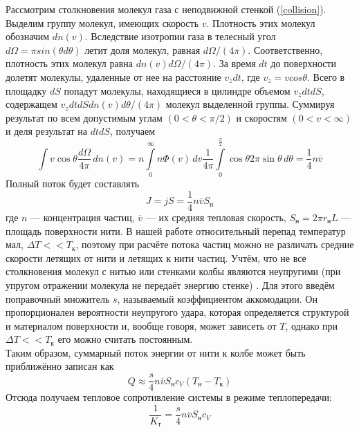 \documentclass[12pt]{article}
\begin{document}
        Рассмотрим столкновения молекул газа с неподвижной стенкой (\ref{collision}). Выделим группу молекул,
        имеющих скорость $v$. Плотность этих молекул обозначим $dn(v)$. Вследствие изотропии газа в телесный угол
        $d\Omega = \pi sin(\theta d\theta)$ летит доля молекул, равная $d\Omega/(4\pi)$. Соответственно,
        плотность этих молекул равна $dn(v)d\Omega/(4\pi)$. За время $dt$ до поверхности долетят молекулы, удаленные
        от нее на расстояние $v_zdt$, где $v_z = v cos\theta$. Всего в площадку $dS$ попадут молекулы, находящиеся в
        цилиндре объемом $v_zdtdS$, содержащем $v_zdtdSdn(v)d\theta/(4\pi)$ молекул выделенной группы. Суммируя результат
        по всем допустимым углам $(0 < \theta < \pi/2)$ и скоростям $(0 < v < \infty)$ и деля результат на $dtdS$, получаем
        \begin{equation}
            \int\limits v \cos\theta\frac{d\Omega}{4\pi}\,dn(v) = n\int\limits_0^\infty n\Phi(v)\,dv \frac{1}{4\pi}\int\limits_0^\frac{\pi}{2} \cos\theta 2\pi \sin\theta\,d\theta = \frac{1}{4}n\overline{v}
        \end{equation}
        Полный поток будет составлять
        \[
            J = jS = \frac{1}{4}n\overline{v}S_{\text{н}}
        \]
        где $n$ — концентрация частиц, $\overline{v}$ — их средняя тепловая скорость, $S_\text{н} = 2\pi r_{\text{н}}L$ — площадь поверхности нити.
        В нашей работе относительный перепад температур мал, $\Delta T << T_{\text{к}}$, поэтому при расчёте потока частиц можно не
        различать средние скорости летящих от нити и летящих к нити частиц. Учтём, что не все столкновения молекул с нитью или
        стенками колбы являются неупругими (при упругом отражении молекула не передаёт энергию
        стенке) \cite{lab_description}. Для этого введём поправочный множитель $s$, называемый коэффициентом аккомодации. Он пропорционален вероятности неупругого удара,
        которая определяется структурой и материалом поверхности и, вообще говоря, может зависеть от $T$, однако при $\Delta T << T_{\text{к}}$
        его можно считать постоянным.\\
        Таким образом, суммарный поток энергии от нити к колбе может быть приближённо записан как
        \[
            Q \approx \frac{s}{4} n \overline{v} S_{\text{н}}c_V(T_\text{н}-T_{\text{к}})
        \]
        Отсюда получаем тепловое сопротивление системы в режиме теплопередачи:
        \begin{equation}\label{K}
            \frac{1}{K_{\text{т}}} = \frac{s}{4} n \overline{v} S_{\text{н}}c_V
        \end{equation}
\end{document}
